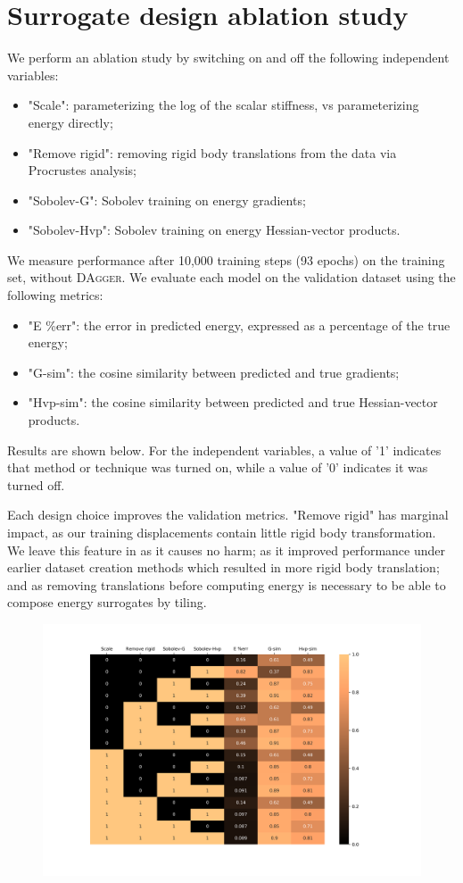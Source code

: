 \section{Surrogate design ablation study}
We perform an ablation study by switching on and off the following independent variables:
\begin{itemize}
\item "Scale": parameterizing the log of the scalar stiffness, vs parameterizing energy directly;
\item "Remove rigid": removing rigid body translations from the data via Procrustes analysis;
\item "Sobolev-G": Sobolev training on energy gradients;
\item "Sobolev-Hvp": Sobolev training on energy Hessian-vector products.
\end{itemize}
We measure performance after 10,000 training steps (93 epochs) on the training set, without \textsc{DAgger}.
We evaluate each model on the validation dataset using the following metrics:
\begin{itemize}
\item "E \%err": the error in predicted energy, expressed as a percentage of the true energy;
\item "G-sim": the cosine similarity between predicted and true gradients;
\item "Hvp-sim": the cosine similarity between predicted and true Hessian-vector products.
\end{itemize}
Results are shown below. For the independent variables, a value of '1' indicates that method or technique was turned on, while a value of '0' indicates it was turned off.

Each design choice improves the validation metrics.
"Remove rigid" has marginal impact, as our training displacements contain little rigid body transformation.
We leave this feature in as it causes no harm;
as it improved performance under earlier dataset creation methods which resulted in more rigid body translation;
and as removing translations before computing energy is necessary to be able to compose energy surrogates by tiling.

\begin{figure}[H]
  \centering
  \includegraphics[width=.8\linewidth]{lces/ablation.png}
\end{figure}

